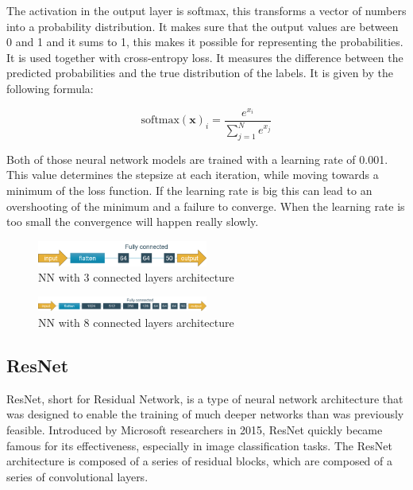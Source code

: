 The activation in the output layer is softmax, this transforms a vector of numbers into a probability distribution. It makes sure that the output values are between 0 and 1 and it sums to 1, this makes it possible for representing the probabilities. It is used together with cross-entropy loss. It measures the difference between the predicted probabilities and the true distribution of the labels. It is given by the following formula: 

\[\text{softmax}(\mathbf{x})_i = \frac{e^{x_i}}{\sum_{j=1}^{N} e^{x_j}}\]

Both of those neural network models are trained with a learning rate of 0.001. This value determines the stepsize at each iteration, while moving towards a minimum of the loss function. If the learning rate is big this can lead to an overshooting of the minimum and a failure to converge. When the learning rate is too small the convergence will happen really slowly. 

\begin{figure}[h]
    \centering
    \includegraphics[width=0.5\textwidth]{figs/basic nn.png}
    \caption{NN with 3 connected layers architecture}
    \label{fig:NN with 3 layers}
\end{figure}

\begin{figure}[h]
    \centering
    \includegraphics[width=0.5\textwidth]{figs/improved NN.png}
    \caption{NN with 8 connected layers architecture}
    \label{fig:NN with 8 layers}
\end{figure}

\subsection{ResNet}
ResNet, short for Residual Network, is a type of neural network architecture that was designed to enable the training of much deeper networks than was previously feasible. Introduced by Microsoft researchers in 2015, ResNet quickly became famous for its effectiveness, especially in image classification tasks. \citet{he_deep_2016} The ResNet architecture is composed of a series of residual blocks, which are composed of a series of convolutional layers. 

